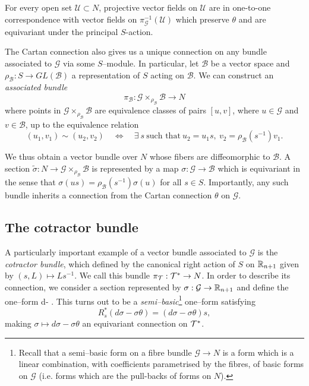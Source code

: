 \begin{rmk} \label{rmk:theta_symmetry}
For every open set $\mathcal{U}\subset N$, projective vector fields on $\mathcal{U}$ are in one-to-one correspondence with vector fields on $\pi_\mathcal{G}^{-1}(\mathcal{U})$
which preserve $\theta$ and are equivariant under the principal $S$-action.
\end{rmk}


\begin{rmk}
The Cartan connection also gives us a unique connection on any bundle associated to $\mathcal{G}$ via some $S$--module. In particular, let $\mathcal{B}$ be a vector space and $\rho_\mathcal{B}:S\rightarrow GL(\mathcal{B})$ a representation of $S$ acting on $\mathcal{B}$. We can construct an \textit{associated bundle}
\[\pi_\mathcal{B}:\mathcal{G}\times_{\rho_\mathcal{B}} \mathcal{B}\rightarrow N \]
where points in $\mathcal{G}\times_{\rho_\mathcal{B}} \mathcal{B}$ are equivalence classes of pairs $[u,v]$, where $u\in \mathcal{G}$ and $v\in \mathcal{B}$, up to the equivalence relation
\[
(u_1,v_1)\sim (u_2,v_2) \quad \Leftrightarrow \quad \exists\ s\ \mbox{such that}\  u_2=u_1 s,\  v_2 = \rho_\mathcal{B}(s^{-1}) v_1.
\]

We thus obtain a vector bundle over $N$ whose fibers are diffeomorphic to $\mathcal{B}$. A section $\tilde{\sigma}:N\rightarrow \mathcal{G}\times_{\rho_\mathcal{B}} \mathcal{B}$ is represented by a map ${\sigma}:\mathcal{G}\rightarrow \mathcal{B}$ which is equivariant in the sense that ${\sigma}(us)=\rho_\mathcal{B}(s^{-1}){\sigma}(u)$ for all $s\in S$. Importantly, any such bundle inherits a connection from the Cartan connection $\theta$ on $\mathcal{G}$.
\end{rmk}


\subsection{The cotractor bundle}
A particularly important example of a vector bundle associated to $\mathcal{G}$ is the \textit{cotractor bundle}, which defined by the canonical right action of $S$ on $\mathbb{R}_{n+1}$ given by $(s,L)\mapsto Ls^{-1}$. We call this bundle $\pi_\mathcal{T}:\mathcal{T}^*\rightarrow N$. In order to describe its connection, we consider a section represented by $\sigma:\mathcal{G}\rightarrow\mathbb{R}_{n+1}$ and define the one--form
\be \label{eq:df-ftheta}
d\sigma - \sigma\theta.
\ee
This turns out to be a \textit{semi--basic}\footnote{Recall that a semi--basic form on a fibre bundle $\mathcal{G}\rightarrow N$ is a form which is a linear combination, with coefficients parametrised by the fibres, of basic forms on $\mathcal{G}$ (i.e. forms which are the pull-backs of forms on $N$).} one--form satisfying
\[
R_s^*(d\sigma-\sigma\theta) = (d\sigma - \sigma\theta)s,
\]
making $\sigma\mapsto d\sigma-\sigma\theta$ an equivariant connection on $\mathcal{T}^*$.

